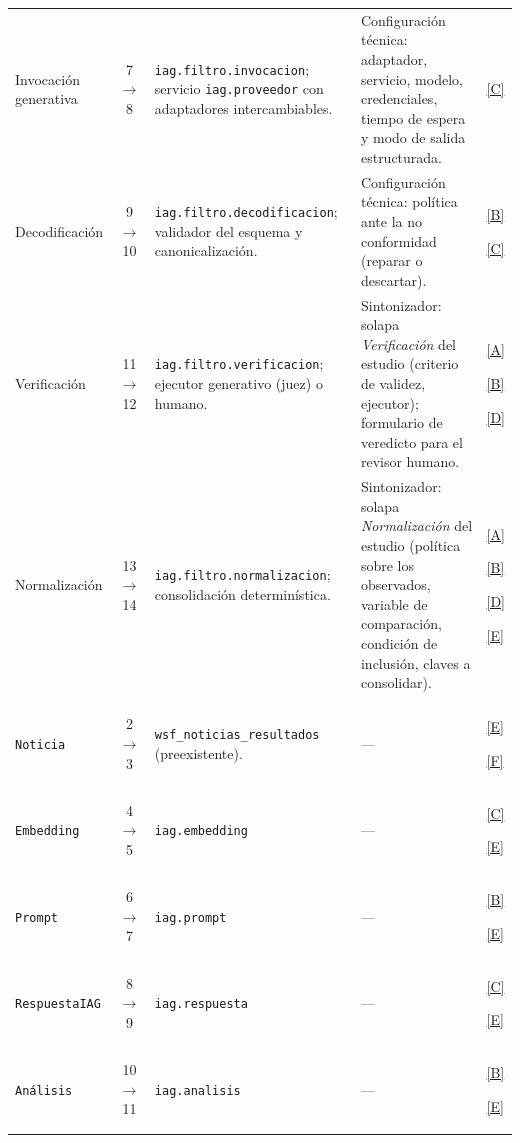 \documentclass[12pt]{report}
\DeclareRobustCommand{\resp}[1]{\hyperref[tab:registro-responsabilidades]{\textcolor{respcolor}{[#1]}}}
\begin{document}
{\begin{xltabular}{\textwidth}{@{}>{\raggedright\arraybackslash}p{2.3cm} c >{\raggedright\arraybackslash}p{4.8cm} >{\raggedright\arraybackslash}X >{\centering\arraybackslash}p{0.75cm}@{}}
      \addlinespace
      Invocación generativa & 7$\to$8 & \texttt{iag.filtro.}\allowbreak\texttt{invocacion}; servicio \texttt{iag.proveedor} con adaptadores intercambiables. & Configuración técnica: adaptador, servicio, modelo, credenciales, tiempo de espera y modo de salida estructurada. & \resp{C}\\
      \addlinespace
      Decodificación & 9$\to$10 & \texttt{iag.filtro.}\allowbreak\texttt{decodificacion}; validador del esquema y canonicalización. & Configuración técnica: política ante la no conformidad (reparar o descartar). & \resp{B}\par\resp{C}\\
      \addlinespace
      Verificación & 11$\to$12 & \texttt{iag.filtro.}\allowbreak\texttt{verificacion}; ejecutor generativo (juez) o humano. & Sintonizador: solapa \textit{Verificación} del estudio (criterio de validez, ejecutor); formulario de veredicto para el revisor humano. & \resp{A}\par\resp{B}\par\resp{D}\\
      \addlinespace
      Normalización & 13$\to$14 & \texttt{iag.filtro.}\allowbreak\texttt{normalizacion}; consolidación determinística. & Sintonizador: solapa \textit{Normalización} del estudio (política sobre los observados, variable de comparación, condición de inclusión, claves a consolidar). & \resp{A}\par\resp{B}\par\resp{D}\par\resp{E}\\
      \addlinespace[4pt]
       \\
      \addlinespace[2pt]
      \texttt{Noticia} & 2$\to$3 & \texttt{wsf\_noticias\_resultados} (preexistente). & --- & \resp{E}\par\resp{F}\\
      \texttt{Embedding} & 4$\to$5 & \texttt{iag.embedding} & --- & \resp{C}\par\resp{E}\\
      \texttt{Prompt} & 6$\to$7 & \texttt{iag.prompt} & --- & \resp{B}\par\resp{E}\\
      \texttt{RespuestaIAG} & 8$\to$9 & \texttt{iag.respuesta} & --- & \resp{C}\par\resp{E}\\
      \texttt{Análisis} & 10$\to$11 & \texttt{iag.analisis} & --- & \resp{B}\par\resp{E}\\

\end{xltabular}}
\end{document}

